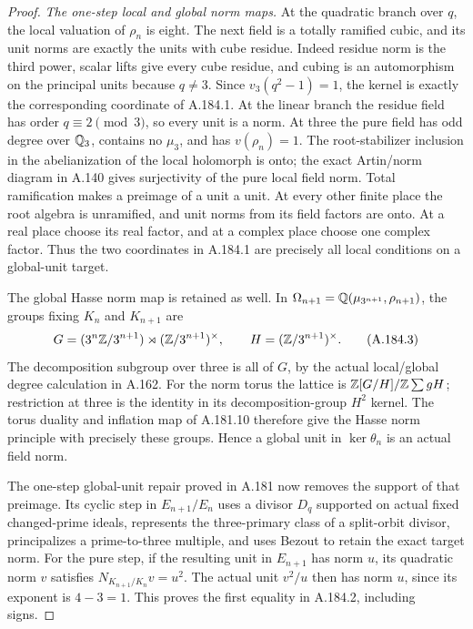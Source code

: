\begin{proof}
\emph{The one-step local and global norm maps.}
At the quadratic branch over \(q\), the local valuation of
\(\rho_n\) is eight.  The next field is a totally ramified
cubic, and its unit norms are exactly the units with cube residue.
Indeed residue norm is the third power, scalar lifts give every
cube residue, and cubing is an automorphism on the principal
units because \(q\ne3\).  Since
\(v_3(q^2-1)=1\), the kernel is exactly the corresponding
coordinate of A.184.1.  At the linear branch the residue field
has order \(q\equiv2\pmod3\), so every unit is a norm.
At three the pure field has odd degree over \(\mathbb Q_3\),
contains no \(\mu_3\), and has \(v(\rho_n)=1\).
The root-stabilizer inclusion in the abelianization of the
local holomorph is onto; the exact Artin/norm diagram in
A.140 gives surjectivity of the pure local field norm.
Total ramification makes a preimage of a unit a unit.
At every other finite place the root algebra is unramified,
and unit norms from its field factors are onto.  At a real
place choose its real factor, and at a complex place choose
one complex factor.  Thus the two coordinates in A.184.1
are precisely all local conditions on a global-unit target.

The global Hasse norm map is retained as well.  In
\(\Omega_{n+1}=\mathbb Q(\mu_{3^{n+1}},\rho_{n+1})\), the
groups fixing \(K_n\) and \(K_{n+1}\) are
\[
 G=(3^n\mathbb Z/3^{n+1})\rtimes(\mathbb Z/3^{n+1})^\times,
 \qquad H=(\mathbb Z/3^{n+1})^\times.
\tag{A.184.3}
\]
The decomposition subgroup over three is all of \(G\),
by the actual local/global degree calculation in A.162.
For the norm torus the lattice is
\(\mathbb Z[G/H]/\mathbb Z\sum gH\); restriction at three is the
identity in its decomposition-group \(H^2\) kernel.
The torus duality and inflation map of A.181.10 therefore
give the Hasse norm principle with precisely these groups.
Hence a global unit in \(\ker\theta_n\) is an actual
field norm.

The one-step global-unit repair proved in A.181 now removes
the support of that preimage.  Its cyclic step in
\(E_{n+1}/E_n\) uses a divisor \(D_q\) supported on
actual fixed changed-prime ideals, represents the three-primary
class of a split-orbit divisor, principalizes a prime-to-three
multiple, and uses Bezout to retain the exact target norm.
For the pure step, if the resulting unit in \(E_{n+1}\)
has norm \(u\), its quadratic norm \(v\) satisfies
\(N_{K_{n+1}/K_n}v=u^2\).  The actual unit \(v^2/u\)
then has norm \(u\), since its exponent is \(4-3=1\).
This proves the first equality in A.184.2, including signs.


\end{proof}
